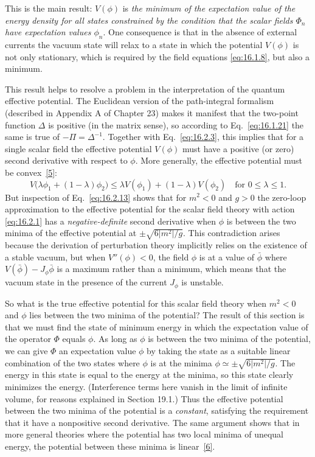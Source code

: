 This is the main result: $V(\phi)$ is \emph{the minimum of the expectation value of the energy density for all states constrained by the condition that the scalar fields $\Phi_n$ have expectation values $\phi_n$}. One consequence is that in the absence of external currents the vacuum state will relax to a state in which the potential $V(\phi)$ is not only stationary, which is required by the field equations \eqref{eq:16.1.8}, but also a minimum.

This result helps to resolve a problem in the interpretation of the quantum effective potential. The Euclidean version of the path-integral formalism (described in Appendix A of Chapter 23) makes it manifest that the two-point function $\Delta$ is positive (in the matrix sense), so according to Eq.~\eqref{eq:16.1.21} the same is true of $-\Pi=\Delta^{-1}$. Together with Eq.~\eqref{eq:16.2.3}, this implies that for a single scalar field the effective potential $V(\phi)$ must have a positive (or zero) second derivative with respect to $\phi$. More generally, the effective potential must be convex~\hyperref[ch16-ref-5]{[5]}:
\[
V\bigl(\lambda\phi_1+(1-\lambda)\phi_2\bigr)
\leq \lambda V(\phi_1)+(1-\lambda)V(\phi_2)
\quad\text{for }0\leq\lambda\leq1.
\]
But inspection of Eq.~\eqref{eq:16.2.13} shows that for $m^2<0$ and $g>0$ the zero-loop approximation to the effective potential for the scalar field theory with action \eqref{eq:16.2.1} has a \emph{negative-definite} second derivative when $\phi$ is between the two minima of the effective potential at $\pm\sqrt{6\lvert m^2\rvert/g}$. This contradiction arises because the derivation of perturbation theory implicitly relies on the existence of a stable vacuum, but when $V''(\phi)<0$, the field $\phi$ is at a value of $\bar\phi$ where $V(\bar\phi)-J_\phi\bar\phi$ is a maximum rather than a minimum, which means that the vacuum state in the presence of the current $J_\phi$ is unstable.

So what is the true effective potential for this scalar field theory when $m^2<0$ and $\phi$ lies between the two minima of the potential? The result of this section is that we must find the state of minimum energy in which the expectation value of the operator $\Phi$ equals $\phi$. As long as $\phi$ is between the two minima of the potential, we can give $\Phi$ an expectation value $\phi$ by taking the state as a suitable linear combination of the two states where $\phi$ is at the minima $\phi\simeq\pm\sqrt{6\lvert m^2\rvert/g}$. The energy in this state is equal to the energy at the minima, so this state clearly minimizes the energy. (Interference terms here vanish in the limit of infinite volume, for reasons explained in Section 19.1.) Thus the effective potential between the two minima of the potential is a \emph{constant}, satisfying the requirement that it have a nonpositive second derivative. The same argument shows that in more general theories where the potential has two local minima of unequal energy, the potential between these minima is linear~\hyperref[ch16-ref-6]{[6]}.
